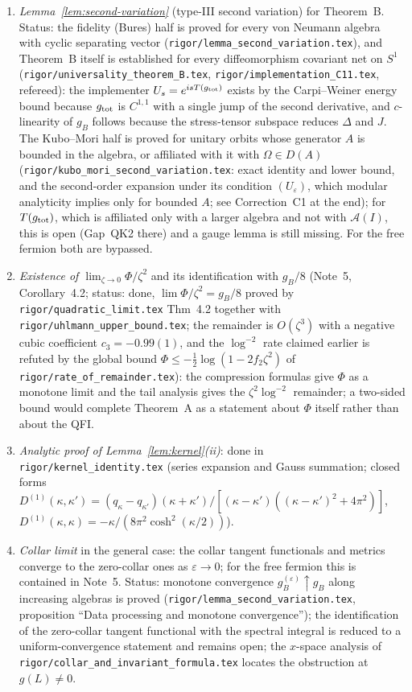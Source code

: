 \documentclass[11pt]{article}
\theoremstyle{accent}
\theoremstyle{definition}
\newcommand{\cA}{\mathcal{A}}
\newcommand{\eps}{\varepsilon}
\begin{document}
\begin{enumerate}
\item \emph{Lemma~\ref{lem:second-variation}} (type-III second variation) for Theorem~B.  Status: the fidelity (Bures) half is proved for every von Neumann algebra with cyclic separating vector (\texttt{rigor/lemma\_second\_variation.tex}), and Theorem~B itself is established for every diffeomorphism covariant net on \(S^1\) (\texttt{rigor/universality\_theorem\_B.tex}, \texttt{rigor/implementation\_C11.tex}, refereed): the implementer \(U_s=e^{isT(g_{\rm tot})}\) exists by the Carpi--Weiner energy bound because \(g_{\rm tot}\) is \(C^{1,1}\) with a single jump of the second derivative, and \(c\)-linearity of \(g_B\) follows because the stress-tensor subspace reduces \(\Delta\) and \(J\).  The Kubo--Mori half is proved for unitary orbits whose generator \(A\) is bounded in the algebra, or affiliated with it with \(\Omega\in D(A)\) (\texttt{rigor/kubo\_mori\_second\_variation.tex}: exact identity and lower bound, and the second-order expansion under its condition \((U_\varepsilon)\), which modular analyticity implies only for bounded \(A\); see Correction~C1 at the end); for \(T(g_{\rm tot})\), which is affiliated only with a larger algebra and not with \(\cA(I)\), this is open (Gap~QK2 there) and a gauge lemma is still missing.  For the free fermion both are bypassed.
\item \emph{Existence of \(\lim_{\zeta\to0}\Phi/\zeta^2\)} and its identification with \(g_B/8\) (Note~5, Corollary~4.2; status: done, \(\lim\Phi/\zeta^2=g_B/8\) proved by \texttt{rigor/quadratic\_limit.tex} Thm~4.2 together with \texttt{rigor/uhlmann\_upper\_bound.tex}; the remainder is \(O(\zeta^3)\) with a negative cubic coefficient \(c_3=-0.99(1)\), and the \(\log^{-2}\) rate claimed earlier is refuted by the global bound \(\Phi\le-\frac12\log(1-2f_2\zeta^2)\) of \texttt{rigor/rate\_of\_remainder.tex}): the compression formulas give \(\Phi\) as a monotone limit and the tail analysis gives the \(\zeta^2\log^{-2}\) remainder; a two-sided bound would complete Theorem~A as a statement about \(\Phi\) itself rather than about the QFI.
\item \emph{Analytic proof of Lemma~\ref{lem:kernel}(ii)}: done in \texttt{rigor/kernel\_identity.tex} (series expansion and Gauss summation; closed forms \(D^{(1)}(\kappa,\kappa')=(q_\kappa-q_{\kappa'})(\kappa+\kappa')/[(\kappa-\kappa')((\kappa-\kappa')^2+4\pi^2)]\), \(D^{(1)}(\kappa,\kappa)=-\kappa/(8\pi^2\cosh^2(\kappa/2))\)).
\item \emph{Collar limit} in the general case: the collar tangent functionals and metrics converge to the zero-collar ones as \(\eps\to0\); for the free fermion this is contained in Note~5.  Status: monotone convergence \(g_B^{(\eps)}\uparrow g_B\) along increasing algebras is proved (\texttt{rigor/lemma\_second\_variation.tex}, proposition ``Data processing and monotone convergence''); the identification of the zero-collar tangent functional with the spectral integral is reduced to a uniform-convergence statement and remains open; the \(x\)-space analysis of \texttt{rigor/collar\_and\_invariant\_formula.tex} locates the obstruction at \(g(L)\neq0\).
\end{enumerate}
\end{document}
